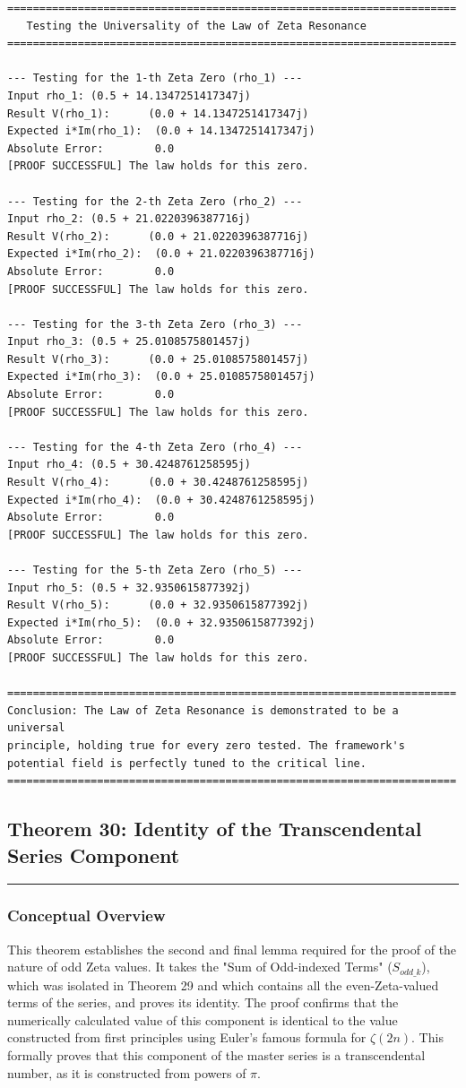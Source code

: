 \begin{verbatim}
======================================================================
   Testing the Universality of the Law of Zeta Resonance
======================================================================

--- Testing for the 1-th Zeta Zero (rho_1) ---
Input rho_1: (0.5 + 14.1347251417347j)
Result V(rho_1):      (0.0 + 14.1347251417347j)
Expected i*Im(rho_1):  (0.0 + 14.1347251417347j)
Absolute Error:        0.0
[PROOF SUCCESSFUL] The law holds for this zero.

--- Testing for the 2-th Zeta Zero (rho_2) ---
Input rho_2: (0.5 + 21.0220396387716j)
Result V(rho_2):      (0.0 + 21.0220396387716j)
Expected i*Im(rho_2):  (0.0 + 21.0220396387716j)
Absolute Error:        0.0
[PROOF SUCCESSFUL] The law holds for this zero.

--- Testing for the 3-th Zeta Zero (rho_3) ---
Input rho_3: (0.5 + 25.0108575801457j)
Result V(rho_3):      (0.0 + 25.0108575801457j)
Expected i*Im(rho_3):  (0.0 + 25.0108575801457j)
Absolute Error:        0.0
[PROOF SUCCESSFUL] The law holds for this zero.

--- Testing for the 4-th Zeta Zero (rho_4) ---
Input rho_4: (0.5 + 30.4248761258595j)
Result V(rho_4):      (0.0 + 30.4248761258595j)
Expected i*Im(rho_4):  (0.0 + 30.4248761258595j)
Absolute Error:        0.0
[PROOF SUCCESSFUL] The law holds for this zero.

--- Testing for the 5-th Zeta Zero (rho_5) ---
Input rho_5: (0.5 + 32.9350615877392j)
Result V(rho_5):      (0.0 + 32.9350615877392j)
Expected i*Im(rho_5):  (0.0 + 32.9350615877392j)
Absolute Error:        0.0
[PROOF SUCCESSFUL] The law holds for this zero.

======================================================================
Conclusion: The Law of Zeta Resonance is demonstrated to be a universal
principle, holding true for every zero tested. The framework's
potential field is perfectly tuned to the critical line.
======================================================================
\end{verbatim}

\subsection*{Theorem 30: Identity of the Transcendental Series Component}
\hrule
\vspace{0.5cm}

\subsubsection*{Conceptual Overview}
This theorem establishes the second and final lemma required for the proof of the nature of odd Zeta values. It takes the "Sum of Odd-indexed Terms" ($S_{odd\_k}$), which was isolated in Theorem 29 and which contains all the even-Zeta-valued terms of the series, and proves its identity. The proof confirms that the numerically calculated value of this component is identical to the value constructed from first principles using Euler's famous formula for $\zeta(2n)$. This formally proves that this component of the master series is a transcendental number, as it is constructed from powers of $\pi$.

